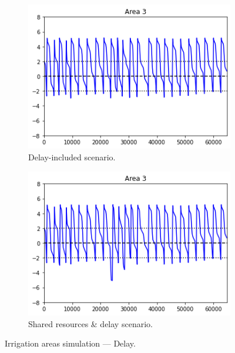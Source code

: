 \documentclass[12pt]{article}
\begin{document}
\begin{figure}[ht]
\centering

\begin{subfigure}[b]{0.475\textwidth}
\centering
\includegraphics[width=\textwidth]{area_delay}
\caption{Delay-included scenario.}
\label{fig:area_delay}
\end{subfigure}
\hfill
\begin{subfigure}[b]{0.475\textwidth}
\centering
\includegraphics[width=\textwidth]{area_mutex_delay}
\caption{Shared resources \& delay scenario.}
\label{fig:area_mutex_delay}
\end{subfigure}

\caption{Irrigation areas simulation — Delay.}
\label{fig:areas_2}
\end{figure}
\end{document}
